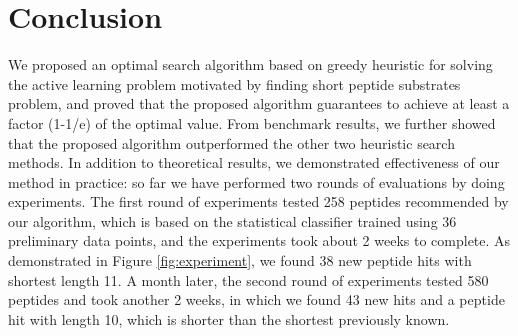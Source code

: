 \documentclass[12pt]{article}
\begin{document}
\section{Conclusion}
We proposed an optimal search algorithm based on greedy heuristic for solving the active learning problem motivated by finding short peptide substrates problem, and proved that the proposed algorithm guarantees to achieve at least a factor (1-1/e) of the optimal value. From benchmark results, we further showed that the proposed algorithm outperformed the other two heuristic search methods. In addition to theoretical results, we demonstrated effectiveness of our method in practice: so far we have performed two rounds of evaluations by doing experiments. The first round of experiments tested 258 peptides recommended by our algorithm, which is based on the statistical classifier trained using 36 preliminary data points, and the experiments took about 2 weeks to complete. As demonstrated in Figure \ref{fig:experiment}, we found 38 new peptide hits with shortest length 11. A month later, the second round of experiments tested 580 peptides and took another 2 weeks, in which we found 43 new hits and a peptide hit with length 10, which is shorter than the shortest previously known. 
\end{document}
